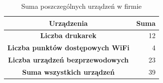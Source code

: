 \documentclass[a4paper,12pt]{extarticle}  %
\begin{document}
\begin{table}[H]
	\centering
	\caption{Suma poszczególnych urządzeń w firmie}
	\vspace{2mm}
	\begin{tabular}{|c|r|}\hline
		\textbf{Urządzenia}                      & \multicolumn{1}{l|}{\textbf{Suma}} \bigstrut \\\hline
		\textbf{Liczba drukarek}                 & 12 \bigstrut                                 \\\hline
		\textbf{Liczba punktów dostępowych WiFi} & 4 \bigstrut                                  \\\hline
		\textbf{Liczba urządzeń bezprzewodowych} & 23 \bigstrut                                 \\\hline
		\textbf{Suma wszystkich urządzeń}        & 39 \bigstrut                                 \\\hline
	\end{tabular}%
	\label{tab:devices_sum}%
\end{table}%

\end{document}
